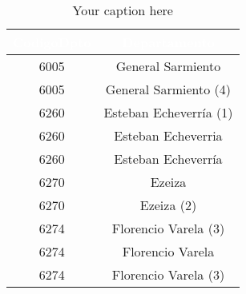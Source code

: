 \begin{table}[htb]
\centering
\begin{tabular}{|c|c|}
\hline
\textbf{\cellcolor[rgb]{0,0.231,0.427}\textcolor{white}{CodigoDpto}} & \textbf{\cellcolor[rgb]{0,0.231,0.427}\textcolor{white}{Departamento}} \\ \hline
6005 & General Sarmiento \\
6005 & General Sarmiento (4) \\
6260 & Esteban Echeverría (1) \\
6260 & Esteban Echeverria \\
6260 & Esteban Echeverría \\
6270 & Ezeiza \\
6270 & Ezeiza (2) \\
6274 & Florencio Varela (3)  \\
6274 & Florencio Varela \\
6274 & Florencio Varela (3)  \\
\hline
\end{tabular}
\caption{Your caption here}
\label{tab:my_table}
\end{table}
